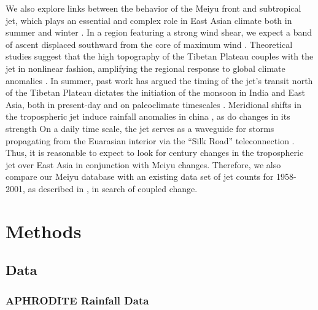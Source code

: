\documentclass[draft,grl]{AGUTeX}
\begin{document}
\begin{article}
	We also explore links between the behavior of the Meiyu front and subtropical jet, which plays an essential and complex role in East Asian climate both in summer and winter \citep{Yang2002}. In a region featuring a strong wind shear, we expect a band of ascent displaced southward from the core of maximum wind \citep{Holton2004}. Theoretical studies suggest that the high topography of the Tibetan Plateau couples with the jet in nonlinear fashion, amplifying the regional response to global climate anomalies \citep{Nigam1989,Broccoli1992,Park1997}. In summer, past work has argued the timing of the jet's transit north of the Tibetan Plateau dictates the initiation of the monsoon in India and East Asia, both in present-day \citep{Yin1949,Hahn1975,Yeh1959} and on paleoclimate timescales \citep{Chiang2015}. Meridional shifts in the tropospheric jet induce rainfall anomalies in china \citep{Liang1998}, as do changes in its strength \citep{Kwon2007,Du2009,Li2014} On a daily time scale, the jet serves as a waveguide for storms propagating from the Euarasian interior via the ``Silk Road'' teleconnection \citep{Hoskins1993,Ambrizzi1997,Kosaka2012}. Thus, it is reasonable to expect to look for  century changes in the tropospheric jet over East Asia in conjunction with Meiyu changes. Therefore, we also compare our Meiyu database with an existing data set of jet counts for 1958-2001, as described in \citet{Schiemann2009}, in search of coupled change.
	
\section{Methods}

\subsection{Data}

\subsubsection{APHRODITE Rainfall Data}


\end{article}
\end{document}
